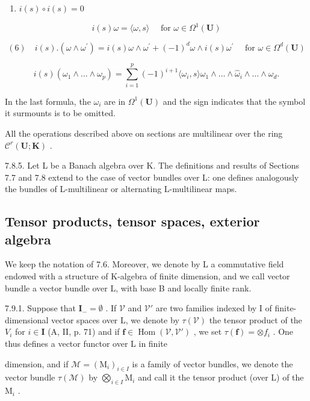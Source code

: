 \begin{enumerate}
\def\labelenumi{(\arabic{enumi})}
\setcounter{enumi}{3}
\tightlist
\item
  \(i(s)\circ i(s) = 0\)
\end{enumerate}

\[
i (s) \omega = \langle \omega , s \rangle \quad \text { for } \omega \in \Omega^ {1} (\mathbf {U}) \tag {5}
\]

\[
(6) \quad i (s). (\omega \wedge \omega^ {\prime}) = i (s) \omega \wedge \omega^ {\prime} + (- 1) ^ {d} \omega \wedge i (s) \omega^ {\prime} \quad \text { for } \omega \in \Omega^ {d} (\mathbf {U})
\]

\[
i (s) (\omega_ {1} \wedge \dots \wedge \omega_ {p}) = \sum_ {i = 1} ^ {p} (- 1) ^ {i + 1} \langle \omega_ {i}, s \rangle \omega_ {1} \wedge \dots \wedge \hat {\omega} _ {i} \wedge \dots \wedge \omega_ {d}.\tag{7}
\]

In the last formula, the \(\omega_{i}\) are in \(\Omega^{1}(\mathbf{U})\) and the sign indicates that the symbol it surmounts is to be omitted.

All the operations described above on sections are multilinear over the ring \(\mathcal{C}^r (\mathbf{U};\mathbf{K})\) .

7.8.5. Let L be a Banach algebra over K. The definitions and results of Sections 7.7 and 7.8 extend to the case of vector bundles over L: one defines analogously the bundles of L-multilinear or alternating L-multilinear maps.

\subsection{Tensor products, tensor spaces, exterior algebra}

We keep the notation of 7.6. Moreover, we denote by L a commutative field endowed with a structure of K-algebra of finite dimension, and we call vector bundle a vector bundle over L, with base B and locally finite rank.

7.9.1. Suppose that \(\mathbf{I}_{-} = \emptyset\) . If \(\mathcal{V}\) and \(\mathcal{V}'\) are two families indexed by I of finite-dimensional vector spaces over L, we denote by \(\tau(\mathcal{V})\) the tensor product of the \(V_{i}\) for \(i \in \mathbf{I}\) (A, II, p. 71) and if \(\mathbf{f} \in \operatorname{Hom}(\mathcal{V}, \mathcal{V}')\) , we set \(\tau(\mathbf{f}) = \otimes f_{i}\) . One thus defines a vector functor over L in finite

dimension, and if \(\mathcal{M} = (\mathrm{M}_{i})_{i\in I}\) is a family of vector bundles, we denote the vector bundle \(\tau(\mathcal{M})\) by \(\bigotimes_{i\in I}\mathrm{M}_{i}\) and call it the tensor product (over L) of the \(\mathrm{M}_{i}\) .

